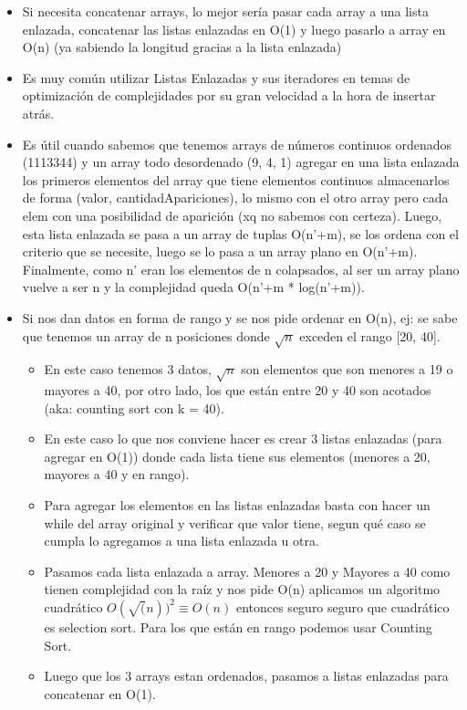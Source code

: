 \documentclass[10pt,a4paper]{article}
\begin{document}
\begin{itemize}
    \item Si necesita concatenar arrays, lo mejor sería pasar cada array a una lista enlazada, concatenar las listas enlazadas en O(1) y luego pasarlo a array en O(n) (ya sabiendo la longitud gracias a la lista enlazada)
    \item Es muy común utilizar Listas Enlazadas y sus iteradores en temas de optimización de complejidades por su gran velocidad a la hora de insertar atrás.
    \item Es útil cuando sabemos que tenemos arrays de números continuos ordenados (1113344) y un array todo desordenado (9, 4, 1) agregar en una lista enlazada los primeros elementos del array que tiene elementos continuos almacenarlos de forma (valor, cantidadApariciones), lo mismo con el otro array pero cada elem con una posibilidad de aparición (xq no sabemos con certeza). Luego, esta lista enlazada se pasa a un array de tuplas O(n'+m), se los ordena con el criterio que se necesite, luego se lo pasa a un array plano en O(n'+m). Finalmente, como n' eran los elementos de n colapsados, al ser un array plano vuelve a ser n y la complejidad queda O(n'+m * log(n'+m)).
    \item Si nos dan datos en forma de rango y se nos pide ordenar en O(n), ej: se sabe que tenemos un array de n posiciones donde $\sqrt{n}$ exceden el rango [20, 40]. 
    \begin{itemize}
        \item En este caso tenemos 3 datos, $\sqrt{n}$ son elementos que son menores a 19 o mayores a 40, por otro lado, los que están entre 20 y 40 son acotados (aka: counting sort con k = 40). 
        \item En este caso lo que nos conviene hacer es crear 3 listas enlazadas (para agregar en O(1)) donde cada lista tiene sus elementos (menores a 20, mayores a 40 y en rango). 
        \item Para agregar los elementos en las listas enlazadas basta con hacer un while del array original y verificar que valor tiene, segun qué caso se cumpla lo agregamos a una lista enlazada u otra.
        \item Pasamos cada lista enlazada a array. Menores a 20 y Mayores a 40 como tienen complejidad con la raíz y nos pide O(n) aplicamos un algoritmo cuadrático $ O(\sqrt(n))^{2} \equiv O(n) $ entonces seguro seguro que cuadrático es selection sort. Para los que están en rango podemos usar Counting Sort. 
        \item Luego que los 3 arrays estan ordenados, pasamos a listas enlazadas para concatenar en O(1).

\end{itemize}
\end{itemize}
\end{document}
